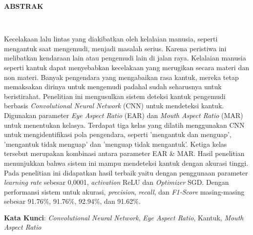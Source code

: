 \clearpage
\centering
{}
 \vspace{1em}
\normalsize \bfseries \centering \MakeUppercase{Abstrak}
% 
\\[2\baselineskip]

\justifying \normalfont \normalsize
{

Kecelakaan lalu lintas yang diakibatkan oleh kelalaian manusia, seperti mengantuk saat mengemudi, menjadi masalah serius. Karena peristiwa ini  melibatkan kendaraan lain atau pengemudi lain di jalan raya. Kelalaian manusia seperti kantuk dapat menyebabkan kecelakaan yang merugikan secara materi dan non materi. Banyak pengendara yang mengabaikan rasa kantuk, mereka tetap memaksakan dirinya untuk mengemudi padahal sudah seharusnya untuk beristirahat. Penelitian ini mengusulkan sistem deteksi kantuk pengemudi berbasis \textit{Convolutional Neural Network} (CNN) untuk mendeteksi kantuk. Digunakan parameter \textit{Eye Aspect Ratio} (EAR) dan \textit{Mouth Aspect Ratio} (MAR) untuk menentukan kelasya. Terdapat tiga kelas yang dilatih menggunakan CNN untuk mengidentifikasi pola pengendara, seperti 'mengantuk dan menguap', 'mengantuk tidak menguap' dan 'menguap tidak mengantuk'. Ketiga kelas tersebut 
merupakan kombinasi antara parameter EAR \& MAR. Hasil penelitian menunjukkan bahwa sistem ini mampu mendeteksi kantuk dengan akurasi tinggi. Pada penelitian ini didapatkan hasil terbaik yaitu dengan penggunaan parameter \textit{learning rate} sebesar 0,0001, \textit{activation} ReLU dan \textit{Optimizer} SGD. Dengan performansi sistem untuk akurasi, \textit{precision}, \textit{recall}, dan \textit{F1-Score} masing-masing 
sebesar 91.76\%, 91.76\%, 92.94\%, dan 91.62\%.

}

\textbf{Kata Kunci}: \textit{Convolutional Neural Network}, \textit{Eye Aspect Ratio}, Kantuk, \textit{Mouth Aspect Ratio}
\clearpage